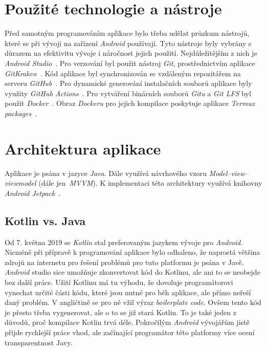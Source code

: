 \section{Použité technologie a nástroje}
Před samotným programováním aplikace bylo třeba udělat průzkum nástrojů, které se při vývoji na zařízení \emph{Android} používají. Tyto nástroje byly vybrány s důrazem na efektivitu vývoje i náročnost jejich použití. Nejdůležitějším z nich je \emph{Android Studio}~. Pro verzování byl použit nástroj \emph{Git}, prostřednictvím aplikace \emph{GitKraken}~. Kód aplikace byl synchronizován se vzdáleným repozitářem na serveru \emph{GitHub}~. Pro dynamické generování instalačních souborů aplikace byly využity \emph{GitHub Actions}~. Pro vytváření binárních souborů \emph{Gitu} a \emph{Git LFS} byl použit \emph{Docker}~. Obraz \emph{Dockeru} pro jejich kompilace poskytuje aplikace \emph{Termux packages}~\label{termux_packages}.

\section{Architektura aplikace}
Aplikace je psána v jazyce \emph{Java}. Dále využívá návrhového vzoru \emph{Model–view–viewmodel} (dále jen~\emph{MVVM}). K implementaci této architektury využívá knihovny \emph{Android Jetpack}~.

    \subsection{Kotlin vs. Java}
    Od 7. května 2019 se \emph{Kotlin} stal preferovaným jazykem vývoje pro \emph{Android}. Nicméně při přípravě k programování aplikace bylo odhaleno, že naprostá většina zdrojů na internetu pro řešení problémů pro tuto platformu je psána v Javě. \emph{Android} studio sice umožňuje zkonvertovat kód do Kotlinu, ale ani to se neobejde bez další práce. Užití Kotlinu má tu výhodu, že dovoluje programátorovi vynechat určité části kódu, které jsou nutné pro běh aplikace, ale přímo neřeší daný problém. V angličtině se pro ně vžil výraz \emph{boilerplate code}. Ovšem tento kód je přesto třeba vygenerovat, ale o to se již stará Kotlin. To je také jeden z důvodů, proč kompilace Kotlin trvá déle. Pokročilým \emph{Android} vývojářům jistě přijde rychlejší práce vhod, ale začínající programátor této platformy více ocení transparentnost Javy.

